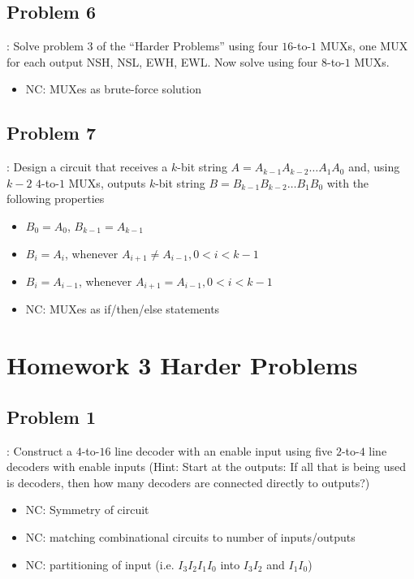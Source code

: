 \documentclass{../slides}
\begin{document}
\subsection{Problem 6}
\begin{frame}{\secname: \subsecname}
    Solve problem 3 of the “Harder Problems” using four $16$-to-$1$ MUXs, one MUX for each output NSH, NSL, EWH, EWL. Now solve using four $8$-to-$1$ MUXs.
    \begin{itemize}
        \item NC: MUXes as brute-force solution
    \end{itemize}
\end{frame}

\subsection{Problem 7}
\begin{frame}{\secname: \subsecname}
    Design a circuit that receives a $k$-bit string $A = A_{k-1}A_{k-2}\dots A_1A_0$ and, using $k - 2$ $4$-to-$1$ MUXs, outputs $k$-bit string $B = B_{k-1}B_{k-2}\dots B_1B_0$ with the following properties
    \begin{itemize}
        \item $B_0 = A_0$, $B_{k-1} = A_{k-1}$
        \item $B_i = A_i$, whenever $A_{i+1}\neq A_{i-1}, 0 < i < k-1$
        \item $B_i = A_{i-1}$, whenever $A_{i+1} = A_{i-1}, 0 < i < k-1$
    \end{itemize}
    \begin{itemize}
        \item NC: MUXes as if/then/else statements
    \end{itemize}
\end{frame}

\section{Homework 3 Harder Problems}
\subsection{Problem 1}
\begin{frame}{\secname: \subsecname}
    Construct a $4$-to-$16$ line decoder with an enable input using five $2$-to-$4$ line decoders with enable inputs (Hint: Start at the outputs: If all that is being used is decoders, then how many decoders are connected directly to outputs?)
    \begin{itemize}
        \item NC: Symmetry of circuit
        \item NC: matching combinational circuits to number of inputs/outputs
        \item NC: partitioning of input (i.e. $I_3I_2I_1I_0$ into $I_3I_2$ and $I_1I_0$)
    \end{itemize}
\end{frame}
\end{document}
